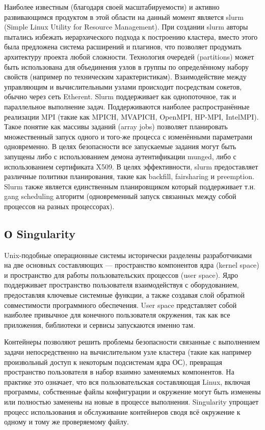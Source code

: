 \documentclass[a4paper]{extarticle}
\begin{document}
Наиболее известным (благодаря своей масштабируемости) и активно развивающимся продуктом в этой области на данный момент является slurm (Simple Linux Utility for Resource Management).  При создании slurm авторы пытались избежать иерархического подхода к построению кластера, вместо этого была предложена система расширений и плагинов, что позволяет продумать архитектуру проекта любой сложности. Технология очередей  (partitions) может быть использована для объединения узлов в группы по определённому набору свойств (например по техническим характеристикам). Взаимодействие между управляющим и вычислительными узлами  происходит посредствам сокетов, обычно через сеть Etherent. Slurm поддерживает как однопоточное, так и параллельное выполнение задач. Поддерживаются наиболее распространённые реализации MPI (такие как MPICH, MVAPICH, OpenMPI, HP-MPI, IntelMPI). Такое понятие как массивы заданий (array jobs) позволяет планировать множественный запуск одного и того-же процесса с изменёнными параметрами одновременно. В целях безопасности все запускаемые задания могут быть запущены либо с использованием демона аутентификации munged, либо с использованием сертификата X509. В целях эффективности, slurm предоставляет различные политики планирования, такие как backfill, fairsharing и preemption. Slurm также является единственным планировщиком который поддерживает т.н. gang scheduling алгоритм (одновременный запуск связанных между собой процессов на разных процессорах).

\subsection*{О Singularity}

Unix-подобные операционные системы исторически разделены разработчиками на две основных составляющих --- пространство компонентов ядра (kernel space) и пространство для работы пользовательских процессов (user space). Ядро поддерживает пространство пользователя взаимодействуя с оборудованием, предоставляя ключевые системные функции, а также создавая слой обратной совместимости программного обеспечения. User space представляет собой наиболее привычное для конечного пользователя окружения, так как  все приложения, библиотеки и сервисы запускаются именно там.

Контейнеры позволяют решить проблемы безопасности связанные с выполнением задачи непосредственно на вычислительном узле кластера (такие как например произвольный доступ к некоторым подсистемам ядра ОС),  превращая пространство пользователя в набор взаимно заменяемых компонентов. На практике это означает, что вся пользовательская составляющая Linux, включая программы, собственные файлы конфигурации и окружение могут быть изменены или полностью заменены на новые в процессе выполнения. Singularity упрощает процесс использования и обслуживание контейнеров сводя всё окружение к одному и тому же проверяемому файлу.
\end{document}
